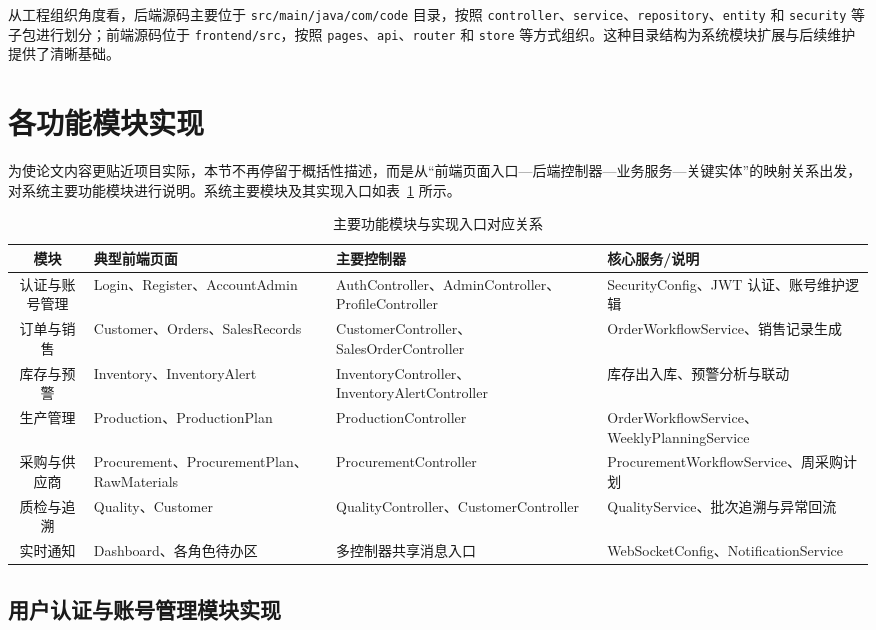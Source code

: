 从工程组织角度看，后端源码主要位于 \texttt{src/main/java/com/code} 目录，按照 \texttt{controller}、\texttt{service}、\texttt{repository}、\texttt{entity} 和 \texttt{security} 等子包进行划分；前端源码位于 \texttt{frontend/src}，按照 \texttt{pages}、\texttt{api}、\texttt{router} 和 \texttt{store} 等方式组织。这种目录结构为系统模块扩展与后续维护提供了清晰基础。

\section{各功能模块实现}

为使论文内容更贴近项目实际，本节不再停留于概括性描述，而是从“前端页面入口—后端控制器—业务服务—关键实体”的映射关系出发，对系统主要功能模块进行说明。系统主要模块及其实现入口如表~\ref{tab:module-file-mapping} 所示。

\begin{table}[htbp]
\centering
\footnotesize
\caption{主要功能模块与实现入口对应关系}
\label{tab:module-file-mapping}
\begin{tabular}{|c|p{3.2cm}|p{3.3cm}|p{4.3cm}|}
\hline
模块 & 典型前端页面 & 主要控制器 & 核心服务/说明 \\\hline
认证与账号管理 & Login、Register、AccountAdmin & AuthController、AdminController、ProfileController & SecurityConfig、JWT 认证、账号维护逻辑 \\\hline
订单与销售 & Customer、Orders、SalesRecords & CustomerController、SalesOrderController & OrderWorkflowService、销售记录生成 \\\hline
库存与预警 & Inventory、InventoryAlert & InventoryController、InventoryAlertController & 库存出入库、预警分析与联动 \\\hline
生产管理 & Production、ProductionPlan & ProductionController & OrderWorkflowService、WeeklyPlanningService \\\hline
采购与供应商 & Procurement、ProcurementPlan、RawMaterials & ProcurementController & ProcurementWorkflowService、周采购计划 \\\hline
质检与追溯 & Quality、Customer & QualityController、CustomerController & QualityService、批次追溯与异常回流 \\\hline
实时通知 & Dashboard、各角色待办区 & 多控制器共享消息入口 & WebSocketConfig、NotificationService \\\hline
\end{tabular}
\end{table}

\subsection{用户认证与账号管理模块实现}


